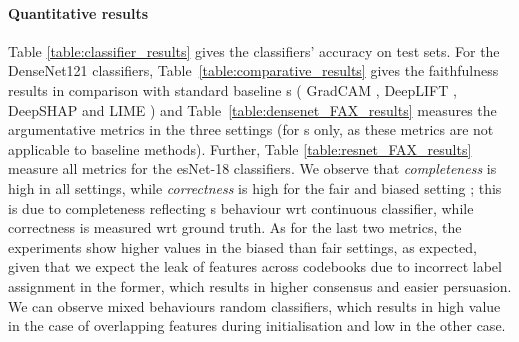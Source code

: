 \paragraph{Quantitative results} Table \ref{table:classifier_results} gives
the classifiers' accuracy on test sets.
For the DenseNet121 classifiers,
Table~\ref{table:comparative_results} gives the faithfulness results  %
in comparison with standard baseline%
s (%
GradCAM \cite{selvaraju2017grad}, DeepLIFT \cite{deeplift},  DeepSHAP \cite{SHAP} and LIME \cite{lime}) and Table~\ref{table:densenet_FAX_results} measures the argumentative metrics in the three settings (for \FAXIC s only, as these metrics are not applicable to baseline methods).
Further,
Table \ref{table:resnet_FAX_results} measure all metrics for the esNet-18 classifiers.
We observe that 
\emph{completeness} is high in all settings, 
while \emph{correctness} is high for the fair and biased setting%
; this is due to completeness reflecting \FAXIC s  behaviour wrt continuous classifier, while correctness is measured wrt ground truth.
As for the last two metrics, the experiments show higher values in the biased than fair settings, as expected, given that  
 we expect the leak of features across codebooks due to incorrect label assignment in the former, which results in higher consensus and easier persuasion.
 We can observe mixed behaviours %
  random classifiers, which results in high value in the case of overlapping features during initialisation and low in the other case.



